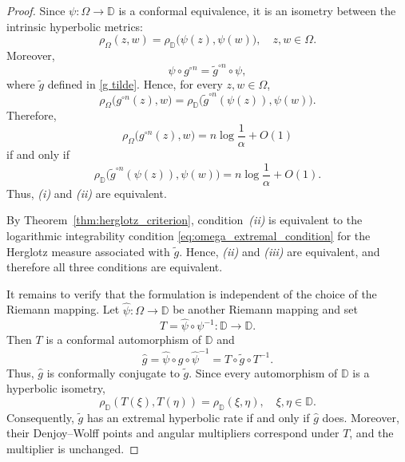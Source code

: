 \documentclass[10pt,a4paper]{amsart}
\numberwithin{equation}{section}
\begin{document}
\begin{proof}
Since $\psi:\Omega\to\mathbb{D}$ is a conformal equivalence, it is an
isometry between the intrinsic hyperbolic metrics:
\begin{equation*}
\label{eq:riemann_hyperbolic_isometry}
\rho_\Omega(z,w)
=
\rho_{\mathbb{D}}\bigl(\psi(z),\psi(w)\bigr),
\quad z,w\in\Omega.
\end{equation*}
Moreover,
\begin{equation*}
\psi\circ g^{\circ n}
=
\widetilde g^{\circ n}\circ\psi,
\end{equation*}
where $\widetilde g$ defined in \eqref{g tilde}.
Hence, for every $z,w\in\Omega$,
\begin{equation*}
\label{eq:orbit_conjugacy}
\rho_\Omega\bigl(g^{\circ n}(z),w\bigr)
=
\rho_{\mathbb{D}}
\bigl(\widetilde g^{\circ n}(\psi(z)),\psi(w)\bigr).
\end{equation*}
Therefore,
\begin{equation*}
\rho_\Omega\bigl(g^{\circ n}(z),w\bigr)
=
n\log\frac1\alpha+O(1)
\end{equation*}
if and only if
\begin{equation*}
\rho_{\mathbb{D}}
\bigl(\widetilde g^{\circ n}(\psi(z)),\psi(w)\bigr)
=
n\log\frac1\alpha+O(1).
\end{equation*}
Thus, \emph{(i)} and \emph{(ii)} are equivalent.

By Theorem~\ref{thm:herglotz_criterion}, condition~\emph{(ii)} is
equivalent to the logarithmic integrability condition
\eqref{eq:omega_extremal_condition} for the Herglotz measure
associated with $\widetilde g$. Hence, \emph{(ii)} and \emph{(iii)} are
equivalent, and therefore all three conditions are equivalent.

It remains to verify that the formulation is independent of the choice of the Riemann mapping. Let
$\widehat\psi:\Omega\to\mathbb{D}$ be another Riemann mapping and set
\begin{equation*}
T=\widehat\psi\circ\psi^{-1}:\mathbb{D}\to\mathbb{D}.
\end{equation*}
Then $T$ is a conformal automorphism of $\mathbb{D}$ and
\begin{equation*}
\widehat g
=
\widehat\psi\circ g\circ\widehat\psi^{-1}
=
T\circ\widetilde g\circ T^{-1}.
\end{equation*}
Thus, $\widehat g$ is conformally conjugate to $\widetilde g$. Since
every automorphism of $\mathbb{D}$ is a hyperbolic isometry,
\begin{equation*}
\rho_{\mathbb{D}}(T(\xi),T(\eta))
=
\rho_{\mathbb{D}}(\xi,\eta),
\quad \xi,\eta\in\mathbb{D}.
\end{equation*}
Consequently, $\widetilde g$ has an extremal hyperbolic rate if and
only if $\widehat g$ does. Moreover, their Denjoy--Wolff points and
angular multipliers correspond under $T$, and the multiplier is
unchanged.


\end{proof}
\end{document}
